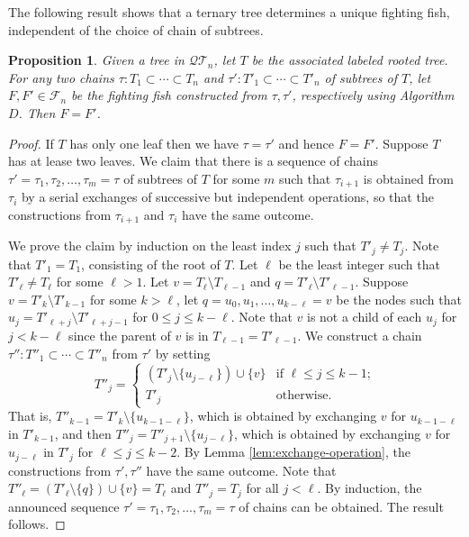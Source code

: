 \documentclass[a4paper,11pt,reqno]{amsart}
\newtheorem{pro}[lem]{Proposition}
\theoremstyle{definition}
\numberwithin{equation}{section}
\newcommand{\QT}{{\mathcal{QT}}}
\newcommand{\F}{{\mathcal{F}}}
\begin{document}
The following result shows that a ternary tree determines a unique fighting fish, independent of the choice of chain of subtrees.



\begin{pro} \label{pro:isomorphic}
Given a tree in $\QT_n$, let $T$ be the associated labeled rooted tree. For any two chains $\tau:T_1\subset\cdots\subset T_n$ and $\tau':T'_1\subset\cdots\subset T'_n$ of subtrees of $T$, let $F, F'\in\F_n$ be the fighting fish constructed from $\tau,\tau'$, respectively using Algorithm $D$. Then $F=F'$.
\end{pro}

\begin{proof} If $T$ has only one leaf then we have $\tau=\tau'$ and hence $F=F'$. Suppose $T$ has at lease two leaves.
We claim that there is a sequence of chains $\tau'=\tau_1,\tau_2,\dots,\tau_m=\tau$ of subtrees of $T$ for some $m$ such that $\tau_{i+1}$ is obtained from $\tau_{i}$ by a serial exchanges of successive but independent operations, so that the constructions from $\tau_{i+1}$ and $\tau_i$ have the same outcome.

We prove the claim by induction on the least index $j$ such that $T'_j\neq T_j$.
Note that $T'_1=T_1$, consisting of the root of $T$. Let $\ell$ be the least integer such that $T'_{\ell}\neq T_{\ell}$ for some $\ell>1$. 
Let $v=T_{\ell}\setminus T_{\ell-1}$ and $q=T'_{\ell}\setminus T'_{\ell-1}$. 
Suppose $v=T'_k\setminus T'_{k-1}$ for some $k>\ell$, let $q=u_0, u_1,\dots, u_{k-\ell}=v$ be the nodes such that $u_j=T'_{\ell+j}\setminus T'_{\ell+j-1}$ for $0\le j\le k-\ell$. Note that $v$ is not a child of each $u_j$ for $j< k-\ell$ since the parent of $v$ is in $T_{\ell-1}=T'_{\ell-1}$.  We construct a chain $\tau'':T''_1\subset\cdots\subset T''_n$ from $\tau'$ by setting 
\begin{equation}
T''_j =\begin{cases}
(T'_j\setminus\{u_{j-\ell}\})\cup\{v\} & \mbox{if $\ell\le j\le k-1$;} \\
T'_j & \mbox{otherwise.}
\end{cases}
\end{equation}
That is, $T''_{k-1}=T'_k\setminus\{u_{k-1-\ell}\}$, which is obtained by exchanging $v$ for $u_{k-1-\ell}$ in $T'_{k-1}$, and then $T''_j=T''_{j+1}\setminus\{u_{j-\ell}\}$, which is obtained by exchanging  $v$ for $u_{j-\ell}$ in $T'_{j}$ for $\ell\le j\le k-2$. 
By Lemma \ref{lem:exchange-operation}, the constructions from $\tau',\tau''$ have the same outcome. Note that $T''_{\ell}=(T'_{\ell}\setminus\{q\})\cup\{v\}=T_{\ell}$ and $T''_j=T_j$ for all $j< \ell$.
By induction, the announced sequence $\tau'=\tau_1,\tau_2,\dots,\tau_m=\tau$ of chains can be obtained. The result follows.
\end{proof}
\end{document}
